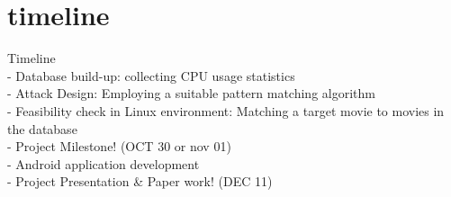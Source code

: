 \section{timeline}
\label{sec:timeline}
Timeline\\
- Database build-up: collecting CPU usage statistics\\
- Attack Design: Employing a suitable pattern matching algorithm\\
- Feasibility check in Linux environment: Matching a target movie to movies in the database\\
- Project Milestone!  (OCT 30 or nov 01)\\
- Android application development\\
- Project Presentation \& Paper work! (DEC 11)
